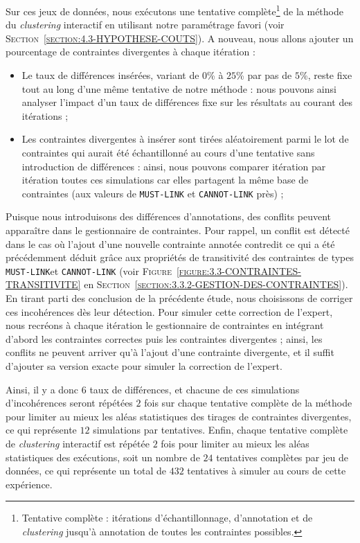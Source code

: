			Sur ces jeux de données, nous exécutons une tentative complète\footnote{
				Tentative complète : itérations d'échantillonnage, d'annotation et de \textit{clustering} jusqu'à annotation de toutes les contraintes possibles.
			}
			de la méthode du \textit{clustering} interactif en utilisant notre paramétrage favori (voir \textsc{Section~\ref{section:4.3-HYPOTHESE-COUTS}}).
			A nouveau, nous allons ajouter un pourcentage de contraintes divergentes à chaque itération :
			\begin{itemize}
				\item Le taux de différences insérées, variant de $0$\% à $25$\% par pas de $5$\%, reste fixe tout au long d'une même tentative de notre méthode : nous pouvons ainsi analyser l'impact d'un taux de différences fixe sur les résultats au courant des itérations ;
				\item Les contraintes divergentes à insérer sont tirées aléatoirement parmi le lot de contraintes qui aurait été échantillonné au cours d'une tentative sans introduction de différences : ainsi, nous pouvons comparer itération par itération toutes ces simulations car elles partagent la même base de contraintes (aux valeurs de \texttt{MUST-LINK} et \texttt{CANNOT-LINK} près) ;
			\end{itemize}
			
			Puisque nous introduisons des différences d'annotations, des conflits peuvent apparaître dans le gestionnaire de contraintes.
			Pour rappel, un conflit est détecté dans le cas où l'ajout d'une nouvelle contrainte annotée contredit ce qui a été précédemment déduit grâce aux propriétés de transitivité des contraintes de types \texttt{MUST-LINK}et \texttt{CANNOT-LINK} (voir \textsc{Figure~\ref{figure:3.3-CONTRAINTES-TRANSITIVITE}} en \textsc{Section~\ref{section:3.3.2-GESTION-DES-CONTRAINTES}}).
			En tirant parti des conclusion de la précédente étude, nous choisissons de corriger ces incohérences dès leur détection.
			Pour simuler cette correction de l'expert, nous recréons à chaque itération le gestionnaire de contraintes en intégrant d'abord les contraintes correctes puis les contraintes divergentes ; ainsi, les conflits ne peuvent arriver qu'à l'ajout d'une contrainte divergente, et il suffit d'ajouter sa version exacte pour simuler la correction de l'expert.
			
			Ainsi, il y a donc $6$ taux de différences, et chacune de ces simulations d'incohérences seront répétées $2$ fois sur chaque tentative complète de la méthode pour limiter au mieux les aléas statistiques des tirages de contraintes divergentes, ce qui représente $12$ simulations par tentatives.
			Enfin, chaque tentative complète de \textit{clustering} interactif est répétée $2$ fois pour limiter au mieux les aléas statistiques des exécutions, soit un nombre de $24$ tentatives complètes par jeu de données, ce qui représente un total de $432$ tentatives à simuler au cours de cette expérience.
			
